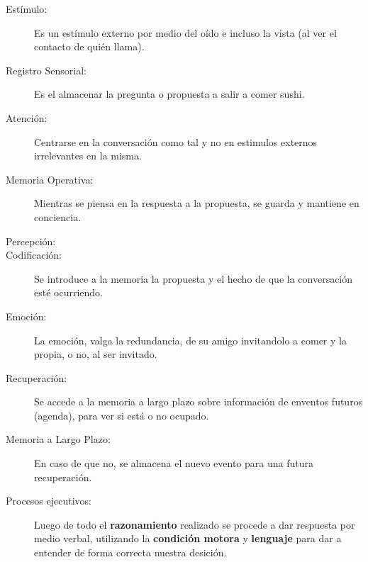 \vspace{0.5cm}

\begin{description}
	\item[Estímulo: ] Es un estímulo externo por medio del oído e incluso la vista (al ver el contacto de quién llama).
	\item[Registro Sensorial:] Es el almacenar la pregunta o propuesta a salir a comer sushi.
	\item[Atención: ] Centrarse en la conversación como tal y no en estimulos externos irrelevantes en la misma.
	\item[Memoria Operativa: ] Mientras se piensa en la respuesta a la propuesta, se guarda y mantiene en conciencia.
	\item[Percepción: ] 
	\item[Codificación: ] Se introduce a la memoria la propuesta y el hecho de que la conversación esté ocurriendo.
	\item[Emoción: ] La emoción, valga la redundancia, de su amigo invitandolo a comer y la propia, o no, al ser invitado.
	\item[Recuperación: ] Se accede a la memoria a largo plazo sobre información de enventos futuros (agenda), para ver si está o no ocupado.
	\item[Memoria a Largo Plazo: ] En caso de que no, se almacena el nuevo evento para una futura recuperación.
	\item[Procesos ejecutivos: ] Luego de todo el \textbf{razonamiento} realizado se procede a dar respuesta por medio verbal, utilizando la \textbf{condición motora} y \textbf{lenguaje} para dar a entender de forma correcta nuestra desición.
\end{description}











